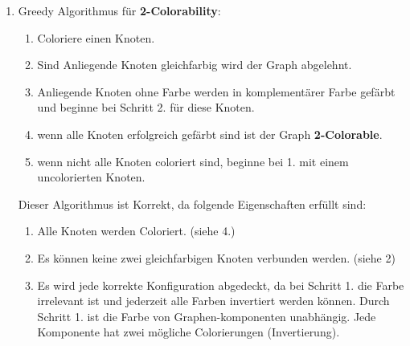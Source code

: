 \documentclass{article}
\begin{document}
\begin{enumerate}[label=(\alph*).]
		\item Greedy Algorithmus für \textbf{2-Colorability}:\\
		\begin{enumerate}[label=\arabic*.]
			\item Coloriere einen Knoten.
			\item Sind Anliegende Knoten gleichfarbig wird der Graph abgelehnt.
			\item Anliegende Knoten ohne Farbe werden in komplementärer Farbe gefärbt und beginne bei Schritt 2. für diese Knoten.
			\item wenn alle Knoten erfolgreich gefärbt sind ist der Graph \textbf{2-Colorable}.
			\item wenn nicht alle Knoten coloriert sind, beginne bei 1. mit einem uncolorierten Knoten.
		\end{enumerate}
		Dieser Algorithmus ist Korrekt, da folgende Eigenschaften erfüllt sind:
		\begin{enumerate}[label=\Roman*.]
			\item Alle Knoten werden Coloriert. (siehe 4.)
			\item Es können keine zwei gleichfarbigen Knoten verbunden werden. (siehe 2)
			\item Es wird jede korrekte Konfiguration abgedeckt, da bei Schritt 1. die Farbe irrelevant ist und jederzeit alle Farben invertiert werden können. Durch Schritt 1. ist die Farbe von Graphen-komponenten unabhängig. Jede Komponente hat zwei mögliche Colorierungen (Invertierung). 
		\end{enumerate}
	\end{enumerate}
\end{document}
